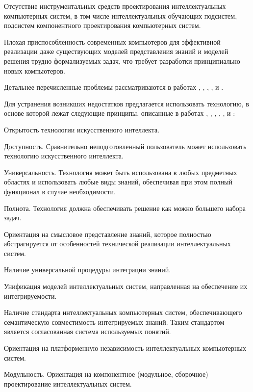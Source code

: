 \begin{partbacktext}
\begin{textitemize}
	\item Отсутствие инструментальных средств проектирования интеллектуальных компьютерных систем, в том числе интеллектуальных обучающих подсистем, подсистем компонентного проектирования компьютерных систем.
	\item Плохая приспособленность современных компьютеров для эффективной реализации даже существующих моделей представления знаний и моделей решения трудно формализуемых задач, что требует разработки принципиально новых компьютеров.
\end{textitemize}
Детальнее перечисленные проблемы рассматриваются в работах , , , ,  и .

Для устранения возникших недостатков предлагается использовать технологию, в основе которой лежат следующие принципы, описанные в работах , , , , ,  и :
\begin{textitemize}
	\item Открытость технологии искусственного интеллекта.
	\item Доступность. Сравнительно неподготовленный пользователь может использовать технологию искусственного интеллекта.
	\item Универсальность. Технология может быть использована в любых предметных областях и использовать любые виды знаний, обеспечивая при этом полный функционал в случае необходимости.
	\item Полнота. Технология должна обеспечивать решение как можно большего набора задач.
	\item Ориентация на смысловое представление знаний, которое полностью абстрагируется от	особенностей технической реализации интеллектуальных систем.
	\item Наличие универсальной процедуры интеграции знаний.
	\item Унификация моделей интеллектуальных систем, направленная на обеспечение их интегрируемости.
	\item Наличие стандарта интеллектуальных компьютерных систем, обеспечивающего семантическую совместимость интегрируемых знаний. Таким стандартом является согласованная система используемых понятий.
	\item Ориентация на платформенную независимость интеллектуальных компьютерных систем.
	\item Модульность. Ориентация на компонентное (модульное, сборочное) проектирование интеллектуальных систем.

\end{textitemize}
\end{partbacktext}
